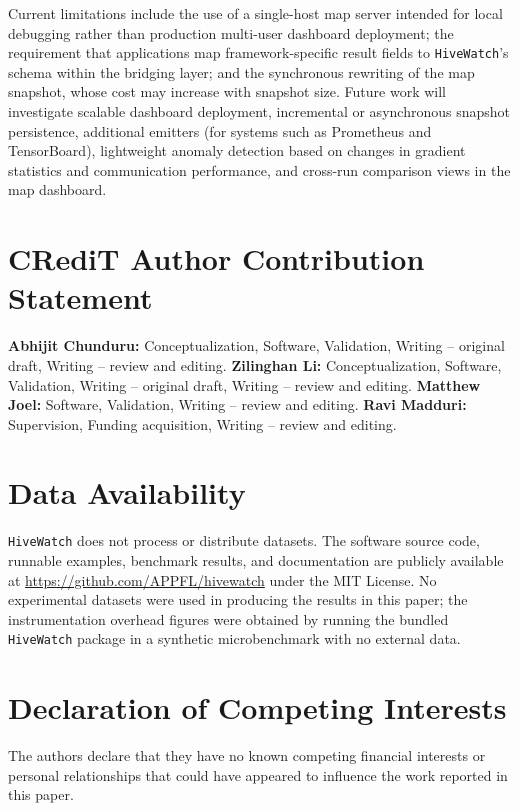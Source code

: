\documentclass[preprint,12pt, a4paper]{elsarticle}
\begin{document}
Current limitations include the use of a single-host map server intended for local debugging rather than production multi-user dashboard deployment; the requirement that applications map framework-specific result fields to \texttt{HiveWatch}'s schema within the bridging layer; and the synchronous rewriting of the map snapshot, whose cost may increase with snapshot size. Future work will investigate scalable dashboard deployment, incremental or asynchronous snapshot persistence, additional emitters (for systems such as Prometheus and TensorBoard), lightweight anomaly detection based on changes in gradient statistics and communication performance, and cross-run comparison views in the map dashboard.

\section*{CRediT Author Contribution Statement}
\textbf{Abhijit Chunduru:} Conceptualization, Software, Validation, Writing -- original draft, Writing -- review and editing.
\textbf{Zilinghan Li:} Conceptualization, Software, Validation, Writing -- original draft, Writing -- review and editing.
\textbf{Matthew Joel:} Software, Validation, Writing -- review and editing.
\textbf{Ravi Madduri:} Supervision, Funding acquisition, Writing -- review and editing.

\section*{Data Availability}
\texttt{HiveWatch} does not process or distribute datasets. The software source code, runnable examples, benchmark results, and documentation are publicly available at \url{https://github.com/APPFL/hivewatch} under the MIT License. No experimental datasets were used in producing the results in this paper; the instrumentation overhead figures were obtained by running the bundled \texttt{HiveWatch} package in a synthetic microbenchmark with no external data.

\section*{Declaration of Competing Interests}
The authors declare that they have no known competing financial interests or personal relationships that could have appeared to influence the work reported in this paper.
\end{document}
